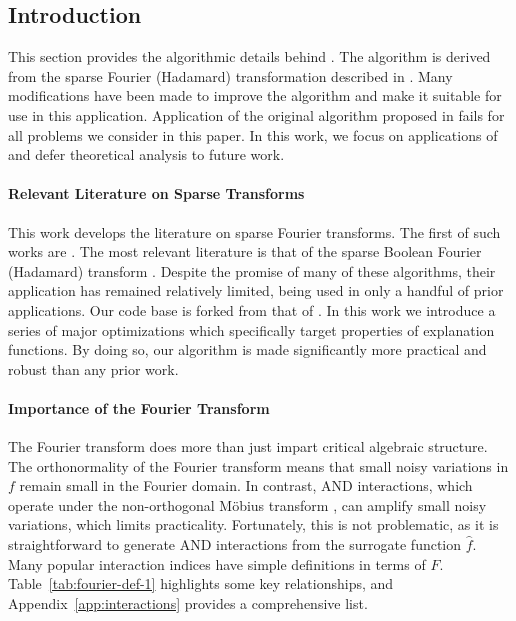 \subsection{Introduction}
This section provides the algorithmic details behind \SpecExp{}. The algorithm is derived from the sparse Fourier (Hadamard) transformation described in \citet{li2015spright}. Many modifications have been made to improve the algorithm and make it suitable for use in this application. Application of the original algorithm proposed in \citet{li2015spright} fails for all problems we consider in this paper. In this work, we focus on applications of \SpecExp{} and defer theoretical analysis to future work. 

\paragraph{Relevant Literature on Sparse Transforms} This work develops the literature on sparse Fourier transforms. The first of such works are \cite{Hassanieh2012, stobbe2012, Pawar2013}. The most relevant literature is that of the sparse Boolean Fourier (Hadamard) transform \cite{li2015spright,amrollahi2019efficiently}. Despite the promise of many of these algorithms, their application has remained relatively limited, being used in only a handful of prior applications. Our code base is forked from that of \cite{erginbas2023efficiently}.
In this work we introduce a series of major optimizations which specifically target properties of explanation functions. By doing so, our algorithm is made significantly more practical and robust than any prior work.

\paragraph{Importance of the Fourier Transform} 
The Fourier transform does more than just impart critical algebraic structure. 
The orthonormality of the Fourier transform means that small noisy variations in $f$ remain small in the Fourier domain. In contrast, AND interactions, which operate under the non-orthogonal Möbius transform \cite{kang2024learning}, can amplify small noisy variations, which limits practicality. Fortunately, this is not problematic, as it is straightforward to generate AND interactions from the surrogate function $\hat{f}$. Many popular interaction indices have simple definitions in terms of $F$.  Table~\ref{tab:fourier-def-1} highlights some key relationships, and Appendix~\ref{app:interactions} provides a comprehensive list. 

